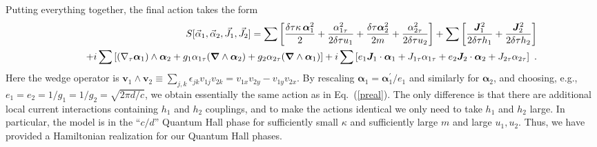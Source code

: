 Putting everything together, the final action takes the form
\begin{eqnarray*}
&& S[{\vec{\alpha}}_1, {\vec{\alpha}}_2, {\vec{J}}_1, {\vec{J}}_2] = 
\sum \left[ \frac{\delta\tau \kappa\, {\bm \alpha}_1^2}{2} + \frac{\alpha_{1\tau}^2}{2\delta\tau u_1} + \frac{\delta\tau {\bm \alpha}_2^2}{2m} + \frac{\alpha_{2\tau}^2}{2\delta\tau u_2} \right]
+ \sum \left[\frac{{\bm {J}}_1^2}{2\delta\tau h_1} + \frac{{\bm {J}}_2^2}{2\delta\tau h_2} \right] \\
&&\quad + i \sum \left[ (\nabla_\tau{\bm \alpha}_1) \wedge {\bm \alpha}_2 + g_1 \alpha_{1\tau} ({\bm \nabla} \wedge {\bm \alpha}_2) + g_2 \alpha_{2\tau} ({\bm \nabla} \wedge {\bm \alpha}_1) \right]
+ i \sum \left[ e_1 {\bm {J}}_1 \cdot {\bm \alpha}_1 + J_{1\tau} \alpha_{1\tau} + e_2 {\bm {J}}_2 \cdot {\bm \alpha}_2 + J_{2\tau} \alpha_{2\tau} \right] ~. 
\end{eqnarray*}
Here the wedge operator is ${\bm v}_1 \wedge {\bm v}_2 \equiv \sum_{j,k} \epsilon_{jk} v_{1j} v_{2k} = v_{1x} v_{2y} - v_{1y} v_{2x}$.
By rescaling ${\bm \alpha}_1 = {\bm \alpha}^\prime_1/e_1$ and similarly for  ${\bm \alpha}_2$, and choosing, e.g., $e_1 = e_2 = 1/g_1 = 1/g_2 = \sqrt{2\pi d/c}$, we obtain essentially the same action as in Eq.~(\ref{preal}).  The only difference is that there are additional local current interactions containing $h_1$ and $h_2$ couplings, and to make the actions identical we only need to take $h_1$ and $h_2$ large.  In particular, the model is in the ``$c/d$'' Quantum Hall phase for sufficiently small $\kappa$ and sufficiently large $m$ and large $u_1, u_2$.
Thus, we have provided a Hamiltonian realization for our Quantum Hall phases.

